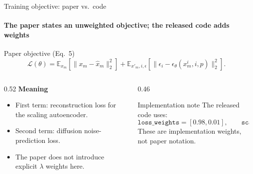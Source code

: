\begin{frame}{Training objective: paper vs.\ code}
\framesubtitle{The paper states an unweighted objective; the released code adds weights}
\begin{block}{Paper objective (Eq.\ 5)}
\[
\mathcal{L}(\theta)
=
\mathbb{E}_{x_m}\!\left[\|x_m-\hat{x}_m\|_2^2\right]
+
\mathbb{E}_{x'_m,i,\epsilon}\!\left[
\|\epsilon_i-\epsilon_\theta(x_m^i,i,p)\|_2^2
\right].
\]
\end{block}

\begin{columns}[T,onlytextwidth]
\begin{column}{0.52\textwidth}\scriptsize
\textbf{Meaning}
\begin{itemize}\setlength\itemsep{0pt}\setlength\topsep{0pt}
  \item First term: reconstruction loss for the scaling autoencoder.
  \item Second term: diffusion noise-prediction loss.
  \item The paper does \alert{not} introduce explicit $\lambda$ weights here.
\end{itemize}
\end{column}
\begin{column}{0.46\textwidth}\scriptsize
\begin{alertblock}{Implementation note}
The released code uses:
\[
\texttt{loss\_weights}=[0.98,0.01],\qquad
\texttt{scale\_weight}=0.01.
\]
These are implementation weights, not paper notation.
\end{alertblock}
\end{column}
\end{columns}
\end{frame}
